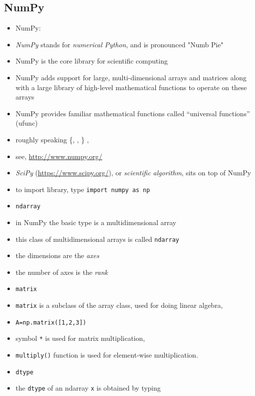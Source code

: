 \documentclass[onecolumn]{IEEEtran} %
\begin{document}
\subsection{NumPy\label{numpy_sec}}
\begin{itemize}
   \item NumPy:
    \bi
        \item \emph{NumPy} stands for \emph{numerical Python}, and is pronounced "Numb Pie"
        \item NumPy is the core library for scientific computing
        \item NumPy adds support for large, multi-dimensional arrays and matrices along with a large library of high-level mathematical functions to operate on these arrays
        \item NumPy provides familiar mathematical functions called “universal functions” (ufunc)
        \item roughly speaking
        \beq
            \{, ,  \} \approx {},
        \eeq
        \item see, \url{http://www.numpy.org/}
        \item \emph{SciPy} (\url{https://www.scipy.org/}), or \emph{scientific algorithm},  sits on top of NumPy
        \item to import library, type \newline
        \verb|import numpy as np|
    \ei
    \item \verb|ndarray|
    \bi
        \item in NumPy the basic type is a multidimensional array
        \item this class of  multidimensional arrays is called \verb|ndarray|
        \item the dimensions are the \emph{axes}
        \item the number of axes is the \emph{rank}
    \ei
    \item \verb|matrix|
    \bi
        \item \verb|matrix| is a subclass of the array class, used for doing linear algebra,
        \item \verb|A=np.matrix([1,2,3])|
        \item symbol \verb|*| is used for matrix multiplication,
        \item \verb|multiply()| function is used for element-wise multiplication.
    \ei
    \item \verb|dtype|
    \bi
        \item the \verb|dtype| of an ndarray \verb|x| is obtained by typing \newline

\end{itemize}
\end{document}

